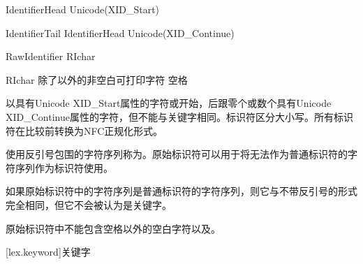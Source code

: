 \begin{bnf}{IdentifierHead}
    Unicode(XID_Start) \br
    \terminal{_}
\end{bnf}

\begin{bnf}{IdentifierTail}
    IdentifierHead \br
    Unicode(XID_Continue)
\end{bnf}

\begin{bnf}{RawIdentifier}
     RIchar\bnfp {}
\end{bnf}

\begin{bnf}{RIchar}
    \textnormal{除了以外的非空白可打印字符} \br
    \textnormal{空格}
\end{bnf}

\pnum
{}以具有Unicode XID_Start属性的字符或\tcode{_}开始，后跟零个或数个具有Unicode XID_Continue属性的字符，但不能与关键字相同。标识符区分大小写。所有标识符在比较前转换为NFC正规化形式。

\pnum
使用反引号包围的字符序列称为。原始标识符可以用于将无法作为普通标识符的字符序列作为标识符使用。

\pnum
如果原始标识符中的字符序列是普通标识符的字符序列，则它与不带反引号的形式完全相同，但它不会被认为是关键字。

\pnum
原始标识符中不能包含空格以外的空白字符以及。

[lex.keyword]{关键字}

